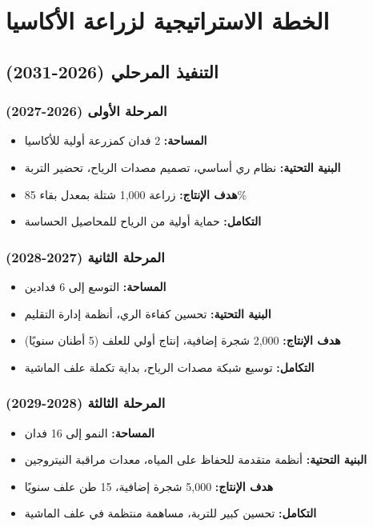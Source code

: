\section{الخطة الاستراتيجية لزراعة الأكاسيا}

\subsection{التنفيذ المرحلي (2026-2031)}

\subsubsection{المرحلة الأولى (2026-2027)}
\begin{itemize}
    \item \textbf{المساحة:} 2 فدان كمزرعة أولية للأكاسيا
    \item \textbf{البنية التحتية:} نظام ري أساسي، تصميم مصدات الرياح، تحضير التربة
    \item \textbf{هدف الإنتاج:} زراعة 1,000 شتلة بمعدل بقاء 85\%
    \item \textbf{التكامل:} حماية أولية من الرياح للمحاصيل الحساسة
\end{itemize}

\subsubsection{المرحلة الثانية (2027-2028)}
\begin{itemize}
    \item \textbf{المساحة:} التوسع إلى 6 فدادين
    \item \textbf{البنية التحتية:} تحسين كفاءة الري، أنظمة إدارة التقليم
    \item \textbf{هدف الإنتاج:} 2,000 شجرة إضافية، إنتاج أولي للعلف (5 أطنان سنويًا)
    \item \textbf{التكامل:} توسيع شبكة مصدات الرياح، بداية تكملة علف الماشية
\end{itemize}

\subsubsection{المرحلة الثالثة (2028-2029)}
\begin{itemize}
    \item \textbf{المساحة:} النمو إلى 16 فدان
    \item \textbf{البنية التحتية:} أنظمة متقدمة للحفاظ على المياه، معدات مراقبة النيتروجين
    \item \textbf{هدف الإنتاج:} 5,000 شجرة إضافية، 15 طن علف سنويًا
    \item \textbf{التكامل:} تحسين كبير للتربة، مساهمة منتظمة في علف الماشية
\end{itemize}

